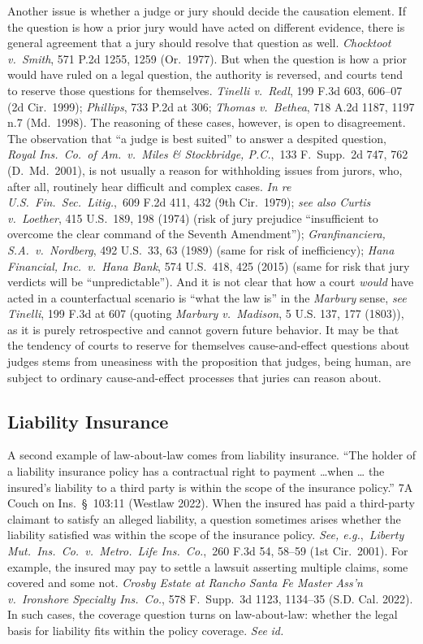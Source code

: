 \documentclass[
  12pt,
  letterpaper,
]{scrartcl}
\begin{document}
Another issue is whether a judge or jury should decide the causation element.
If the question is how a prior jury would have acted on different evidence,
there is general agreement that a jury should resolve that question as well.
\textit{Chocktoot v.~Smith}, 571 P.2d 1255, 1259 (Or.~1977). But when the
question is how a prior  would have ruled on a legal question, the
authority is reversed, and courts tend to reserve those questions for
themselves. \textit{Tinelli v.~Redl}, 199 F.3d 603, 606--07 (2d Cir.~1999);
\textit{Phillips}, 733 P.2d at 306; \textit{Thomas v.~Bethea}, 718 A.2d 1187,
1197 n.7 (Md.~1998). The reasoning of these cases, however, is open to
disagreement. The observation that ``a judge is best suited'' to answer a
despited question, \textit{Royal Ins.~Co.~of Am.~v.~Miles \& Stockbridge, P.C.},~133
F.~Supp.~2d 747, 762 (D.~Md.~2001), is not usually a reason for withholding
issues from jurors, who, after all, routinely hear difficult and complex cases.
\textit{In re U.S.~Fin.~Sec.~Litig.},~609 F.2d 411, 432 (9th Cir.~1979);
\textit{see also} \textit{Curtis v.~Loether}, 415 U.S.~189, 198 (1974) (risk of
jury prejudice ``insufficient to overcome the clear command of the Seventh
Amendment''); \textit{Granfinanciera, S.A.~v.~Nordberg}, 492 U.S.~33, 63 (1989)
(same for risk of inefficiency); \textit{Hana Financial, Inc.~v.~Hana Bank},
574 U.S.~418, 425 (2015) (same for risk that jury verdicts will be
``unpredictable''). And it is not clear that how a court \emph{would} have
acted in a counterfactual scenario is ``what the law is'' in the
\textit{Marbury} sense, \textit{see} \textit{Tinelli}, 199 F.3d at 607 (quoting
\textit{Marbury v.~Madison}, 5 U.S. 137, 177 (1803)), as it is purely
retrospective and cannot govern future behavior. It may be that the tendency of
courts to reserve for themselves cause-and-effect questions about judges stems
from uneasiness with the proposition that judges, being human, are subject to ordinary
cause-and-effect processes that juries can reason about.


\subsection{Liability Insurance}

A second example of law-about-law comes from liability insurance. ``The holder
of a liability insurance policy has a contractual right to payment \ldots when \ldots
the insured's liability to a third party is within the scope of the insurance
policy.'' 7A Couch on Ins.~§~103:11 (Westlaw 2022). When the insured has paid a
third-party claimant to satisfy an alleged liability, a question sometimes
arises whether the liability satisfied was within the scope of the insurance
policy. \textit{See, e.g.},~\textit{Liberty Mut.~Ins.~Co.~v.~Metro.~Life
Ins.~Co.},~260 F.3d 54, 58--59 (1st Cir.~2001). For example, the insured may
pay to settle a lawsuit asserting multiple claims, some covered and some not.
\textit{Crosby Estate at Rancho Santa Fe Master Ass'n v.~Ironshore Specialty
Ins.~Co.}, 578 F.~Supp.~3d 1123, 1134--35 (S.D. Cal. 2022). In such cases, the
coverage question turns on law-about-law: whether the legal basis for liability
fits within the policy coverage. \textit{See} \textit{id.}
\end{document}
